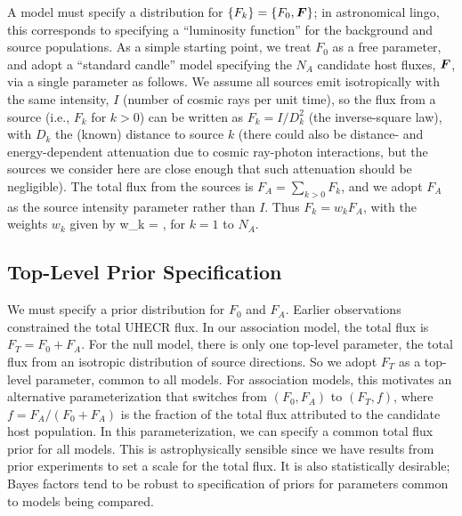 
A model must specify a distribution for $\{F_k\} = \{F_0, \mbox{\boldmath{$F$}}\}$; in
astronomical lingo, this corresponds to specifying a ``luminosity function''
for the background and source populations.  As a simple starting point, we
treat $F_0$ as a free parameter, and adopt a ``standard candle'' model
specifying the $N_A$ candidate host fluxes, $\mbox{\boldmath{$F$}}$, via a single parameter
as follows.  We assume all sources emit isotropically with the same
intensity, $I$ (number of cosmic rays per unit time), so the flux from a
source (i.e., $F_k$ for $k>0$) can be written as $F_k = I/D_k^2$ (the
inverse-square law), with $D_k$ the (known) distance to source $k$ (there
could also be distance- and energy-dependent attenuation due to cosmic
ray-photon interactions, but the sources we consider here are close enough
that such attenuation should be negligible).  The total flux from the
sources is $F_A = \sum_{k>0} F_k$, and we adopt $F_A$ as the source
intensity parameter rather than $I$.  Thus $F_k = w_k F_A$, with the weights
$w_k$ given by
\be
w_k = ,
\label{wt-def}
\ee
for $k=1$ to $N_A$.

\subsection{Top-Level Prior Specification}

We must specify a prior distribution for $F_0$ and $F_A$.
Earlier observations constrained the total UHECR flux.  In our association
model, the total flux is $F_T = F_0 + F_A$.  For the null model, there is
only one top-level parameter, the total flux from an isotropic distribution
of source directions.  So we adopt $F_T$ as a top-level parameter,
common to all models.  For association models, this motivates an alternative
parameterization that switches from $(F_0, F_A)$ to $(F_T, f)$, where $f =
F_A/(F_0 + F_A)$ is the fraction of the total flux attributed to the
candidate host population.
In this parameterization, we can specify a common total flux prior
for all models.  This is astrophysically sensible since we have
results from prior experiments to set a scale for the total flux.
It is also statistically desirable; Bayes factors tend to be robust
to specification of priors for parameters common to models being compared.

